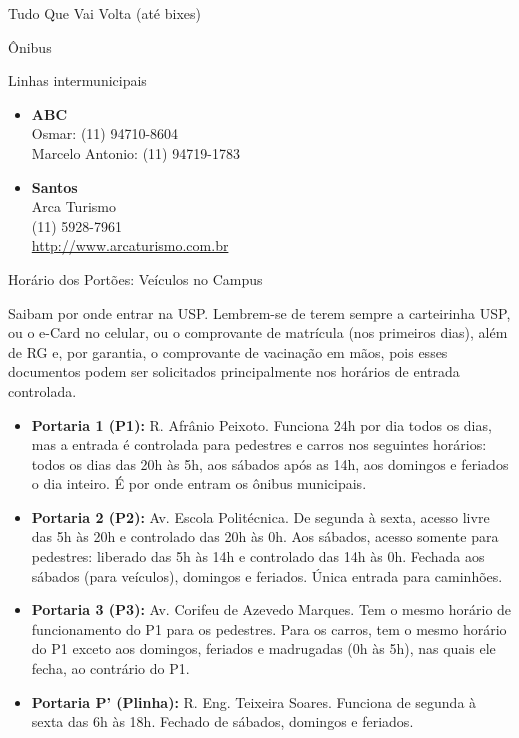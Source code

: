 \begin{secao}{Tudo Que Vai Volta (até bixes)}
\begin{subsecao}{Ônibus}
\begin{subsubsecao}{Linhas intermunicipais}
\begin{itemize}
  \item {\bf ABC}\\
    Osmar: (11) 94710-8604\\
    Marcelo Antonio: (11) 94719-1783

  \item {\bf Santos}\\
    Arca Turismo\\
    (11) 5928-7961\\
    \url{http://www.arcaturismo.com.br}

\end{itemize}

\end{subsubsecao}

\end{subsecao}


\begin{subsecao}{Horário dos Portões: Veículos no Campus}

Saibam por onde entrar na USP. Lembrem-se de terem sempre a carteirinha USP, ou
o e-Card no celular, ou o comprovante de matrícula (nos primeiros dias), além de
RG e, por garantia, o comprovante de vacinação em mãos, pois esses documentos
podem ser solicitados principalmente nos horários de entrada controlada.
\begin{itemize}
  \item {\bf Portaria 1 (P1):} R. Afrânio Peixoto. Funciona 24h por dia todos os
  	dias, mas a entrada é controlada para pedestres e carros nos seguintes
	horários: todos os dias das 20h às 5h, aos sábados após as 14h, aos domingos
	e feriados o dia inteiro. É por onde entram os ônibus municipais.

  \item {\bf Portaria 2 (P2):} Av. Escola Politécnica. De segunda à sexta,
  	acesso livre das 5h às 20h e controlado das 20h às 0h. Aos sábados, acesso
	somente para pedestres: liberado das 5h às 14h e controlado das 14h às 0h.
	Fechada aos sábados (para veículos), domingos e feriados. Única entrada para
	caminhões.

  \item {\bf Portaria 3 (P3):} Av. Corifeu de Azevedo Marques. Tem o mesmo
  	horário de funcionamento do P1 para os pedestres. Para os carros, tem o
	mesmo horário do P1 exceto aos domingos, feriados e madrugadas (0h às 5h),
	nas quais ele fecha, ao contrário do P1.

  \item {\bf Portaria P' (Plinha):} R. Eng. Teixeira Soares. Funciona de segunda
  	à sexta das 6h às 18h. Fechado de sábados, domingos e feriados.


\end{itemize}
\end{subsecao}
\end{secao}
